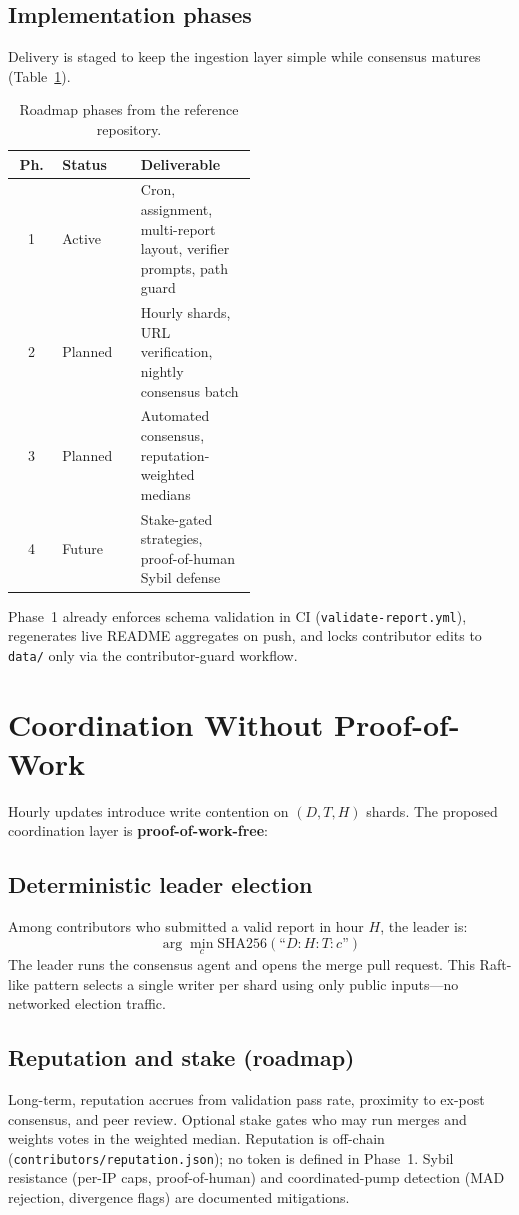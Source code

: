 \documentclass[conference]{IEEEtran}
\begin{document}
\subsection{Implementation phases}
Delivery is staged to keep the ingestion layer simple while consensus matures (Table~\ref{tab:phases}).

\begin{table}[t]
\centering
\caption{Roadmap phases from the reference repository.}
\label{tab:phases}
\begin{tabular}{@{}clp{0.48\linewidth}@{}}
\toprule
\textbf{Ph.} & \textbf{Status} & \textbf{Deliverable} \\
\midrule
1 & Active & Cron, assignment, multi-report layout, verifier prompts, path guard \\
2 & Planned & Hourly shards, URL verification, nightly consensus batch \\
3 & Planned & Automated consensus, reputation-weighted medians \\
4 & Future & Stake-gated strategies, proof-of-human Sybil defense \\
\bottomrule
\end{tabular}
\end{table}

Phase~1 already enforces schema validation in CI (\texttt{validate-report.yml}), regenerates live README aggregates on push, and locks contributor edits to \texttt{data/} only via the contributor-guard workflow.

\section{Coordination Without Proof-of-Work}
\label{sec:coordination}

Hourly updates introduce write contention on $(D, T, H)$ shards.
The proposed coordination layer is \textbf{proof-of-work-free}:

\subsection{Deterministic leader election}
Among contributors who submitted a valid report in hour $H$, the leader is:
\[
\arg\min_{c} \text{SHA256}(\text{``}D:H:T:c\text{''})
\]
The leader runs the consensus agent and opens the merge pull request.
This Raft-like pattern selects a single writer per shard using only public inputs---no networked election traffic.

\subsection{Reputation and stake (roadmap)}
Long-term, reputation accrues from validation pass rate, proximity to ex-post consensus, and peer review.
Optional stake gates who may run merges and weights votes in the weighted median.
Reputation is off-chain (\texttt{contributors/reputation.json}); no token is defined in Phase~1.
Sybil resistance (per-IP caps, proof-of-human) and coordinated-pump detection (MAD rejection, divergence flags) are documented mitigations.
\end{document}
